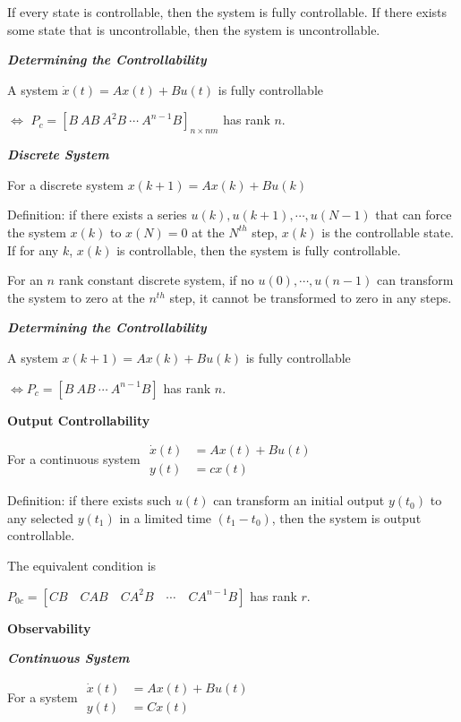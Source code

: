 \documentclass{article}
\newcommand{\bigtitle}[1]{
	\noindent
	\textbf{#1}
}
\newcommand{\smalltitle}[1]{
	\noindent
	\textbf{\textit{#1}}
}
\begin{document}
\begin{spacing}{1.2}
If every state is controllable, then the system is fully controllable. If there exists some state that is uncontrollable, then the system is uncontrollable.

\smalltitle{Determining the Controllability}

A system $\dot{x}(t)=A x(t)+B u(t)$ is fully controllable 

$\Leftrightarrow$ $P_c = \left[B \ AB \ A^2B \ \cdots \ A^{n-1}B \right]_{n\times nm}$  has rank $n$.

\smalltitle{Discrete System}

For a discrete system $x(k+1)=A x(k)+B u(k)$

Definition: if there exists a series $u(k), u(k+1), \cdots, u(N-1)$ that can force the system $x(k)$ to $x(N) = 0$ at the $N^{th}$ step, $x(k)$ is the controllable state. If for any $k$, $x(k)$ is controllable, then the system is fully controllable.

For an $n$ rank constant discrete system, if no $u(0), \cdots, u(n-1)$ can transform the system to zero at the $n^{th}$ step, it cannot be transformed to zero in any steps.

\smalltitle{Determining the Controllability}

A system $x(k+1)=A x(k)+B u(k)$ is fully controllable

$\Leftrightarrow P_c = \left[ B \ AB\ \cdots \ A^{n-1}B \right]$ has rank $n$.

\bigtitle{Output Controllability}

For a continuous system $\begin{aligned} \dot{x}(t) &=A x(t)+B u(t) \\ y(t) &=c x(t) \end{aligned}$

Definition: if there exists such $u(t)$ can transform an initial output $y(t_0)$ to any selected $y(t_1)$ in a limited time $(t_1 - t_0)$, then the system is output controllable.

The equivalent condition is 

$P_{0c} = \left[ CB\quad CAB\quad CA^2B \quad \cdots \quad CA^{n-1}B  \right]$ has rank $r$.


\bigtitle{Observability}

\smalltitle{Continuous System}

For a system $\begin{aligned} \dot{x}(t) &=A x(t)+B u(t) \\ y(t) &=C x(t) \end{aligned}$


\end{spacing}
\end{document}
